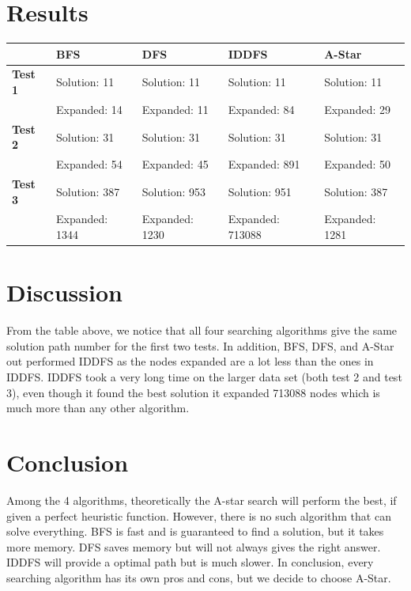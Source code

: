 \documentclass[onecolumn,draftclsnofoot, 10pt, compsoc]{IEEEtran}
\begin{document}
	
	
	
	\section{Results}
	\begin{center}
    \begin{tabular}{|l|l|l|l|l|}
        \hline
        & \textbf{BFS} & \textbf{DFS} & \textbf{IDDFS} & \textbf{A-Star} \\ \hline
        \textbf{Test 1} & Solution: 11 & Solution: 11 & Solution: 11 & Solution: 11 \\
        & Expanded: 14 & Expanded: 11 & Expanded: 84 & Expanded: 29 \\ \hline
        \textbf{Test 2} & Solution: 31 & Solution: 31 & Solution: 31 & Solution: 31 \\
        & Expanded: 54 & Expanded: 45 & Expanded: 891 & Expanded: 50 \\ \hline
        \textbf{Test 3} & Solution: 387 & Solution: 953 & Solution: 951 & Solution: 387 \\
        & Expanded: 1344 & Expanded: 1230 & Expanded: 713088 & Expanded: 1281 \\ \hline
    \end{tabular}
\end{center}
	
	
	
	
	
	\section{Discussion}
	From the table above, we notice that all four searching algorithms give the same solution path number for the first two tests. In addition, BFS, DFS, and A-Star out performed IDDFS as the nodes expanded are a lot less than the ones in IDDFS. 
    \indent IDDFS took a very long time on the larger data set (both test 2 and test 3), even though it found the best solution it expanded 713088 nodes which is much more than any other algorithm.

	
	
	
	
	\section{Conclusion}
	Among the 4 algorithms, theoretically the A-star search will perform the best, if given a perfect heuristic function. However, there is no such algorithm that can solve everything. BFS is fast and is guaranteed to find a solution, but it takes more memory. DFS saves memory but will not always gives the right answer. IDDFS will provide a optimal path but is much slower. In conclusion, every searching algorithm has its own pros and cons, but we decide to choose A-Star. 
    
	
	
\end{document}
